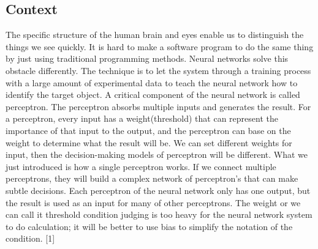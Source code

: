 \subsection{Context}
The specific structure of the human brain and eyes enable us to distinguish the things we see quickly. It is hard to make a software program to do the same thing by just using traditional programming methods. Neural networks solve this obstacle differently. The technique is to let the system through a training process with a large amount of experimental data to teach the neural network how to identify the target object. A critical component of the neural network is called perceptron. The perceptron absorbs multiple inputs and generates the result. For a perceptron, every input has a weight(threshold) that can represent the importance of that input to the output, and the perceptron can base on the weight to determine what the result will be. We can set different weights for input, then the decision-making models of perceptron will be different. What we just introduced is how a single perceptron works. If we connect multiple perceptrons, they will build a complex network of perceptron's that can make subtle decisions.  Each perceptron of the neural network only has one output, but the result is used as an input for many of other perceptrons. The weight or we can call it threshold condition judging is too heavy for the neural network system to do calculation; it will be better to use bias to simplify the notation of the condition. [1]


